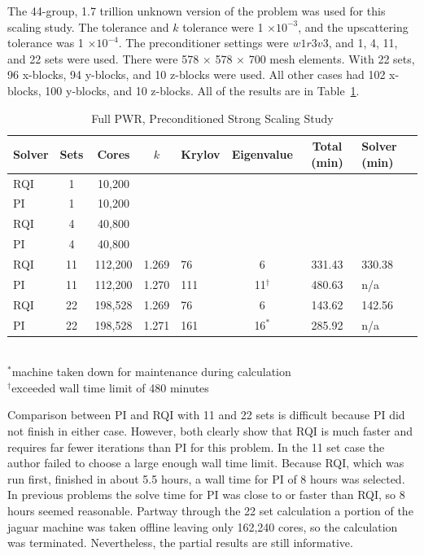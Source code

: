 The 44-group, 1.7 trillion unknown version of the problem was used for this scaling study. The tolerance and $k$ tolerance were 1 $\times 10^{-3}$, and the upscattering tolerance was 1 $\times 10^{-4}$. The preconditioner settings were $w1r3v3$, and 1, 4, 11, and 22 sets were used. There were 578 $\times$ 578 $\times$ 700 mesh elements. With 22 sets, 96 x-blocks, 94 y-blocks, and 10 z-blocks were used. All other cases had 102 x-blocks, 100 y-blocks, and 10 z-blocks. All of the results are in Table~\ref{table:full PWR}. 
%
\begin{table}[!h]
\caption{Full PWR, Preconditioned Strong Scaling Study}
\begin{center}
\begin{tabular}{l c c c l c c l}
\hline
Solver & Sets & Cores & $k$ & Krylov & Eigenvalue & Total (min) & Solver (min)\\[0.5ex]
\hline
RQI & 1   & 10,200   &  &   &                   &  &  \\
PI    & 1   & 10,200   &  &  &       &  &  \\
RQI & 4   & 40,800   &  &    &                   &  &  \\
PI    & 4   & 40,800   &  &  &        &  &  \\
RQI & 11 & 112,200 & 1.269 & 76   & 6                  & 331.43 & 330.38 \\
PI    & 11 & 112,200 & 1.270 & 111 & 11$^{\dag}$ & 480.63 & n/a \\
RQI & 22 & 198,528 & 1.269 & 76   & 6                  & 143.62 & 142.56 \\
PI    & 22 & 198,528 & 1.271 & 161 & 16$^{*}$       & 285.92 & n/a \\
\hline 
\end{tabular}\\
$^{*}$machine taken down for maintenance during calculation \\
$^{\dag}$exceeded wall time limit of 480 minutes
\end{center}
\label{table:full PWR}
\end{table}  

Comparison between PI and RQI with 11 and 22 sets is difficult because PI did not finish in either case. However, both clearly show that RQI is much faster and requires far fewer iterations than PI for this problem. In the 11 set case the author failed to choose a large enough wall time limit. Because RQI, which was run first, finished in about 5.5 hours, a wall time for PI of 8 hours was selected. In previous problems the solve time for PI was close to or faster than RQI, so 8 hours seemed reasonable. Partway through the 22 set calculation a portion of the jaguar machine was taken offline leaving only 162,240 cores, so the calculation was terminated. Nevertheless, the partial results are still informative. 

